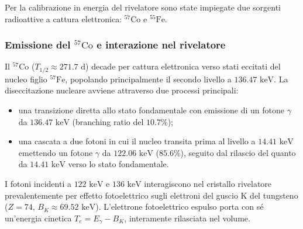 Per la calibrazione in energia del rivelatore sono state impiegate due sorgenti radioattive a cattura elettronica: $^{57}\text{Co}$ e $^{55}\text{Fe}$.

\subsubsection*{Emissione del $^{57}\text{Co}$ e interazione nel rivelatore}
Il $^{57}\text{Co}$ ($T_{1/2} \approx 271.7\text{ d}$) decade per cattura elettronica verso stati eccitati del nucleo figlio $^{57}\text{Fe}$, popolando principalmente il secondo livello a $136.47\text{ keV}$. La diseccitazione nucleare avviene attraverso due processi principali:
\begin{itemize}
    \item una transizione diretta allo stato fondamentale con emissione di un fotone $\gamma$ da $136.47\text{ keV}$ (branching ratio del $10.7\%$);
    \item una cascata a due fotoni in cui il nucleo transita prima al livello a $14.41\text{ keV}$ emettendo un fotone $\gamma$ da $122.06\text{ keV}$ ($85.6\%$), seguito dal rilascio del quanto da $14.41\text{ keV}$ verso lo stato fondamentale.
\end{itemize}

I fotoni incidenti a $122\text{ keV}$ e $136\text{ keV}$ interagiscono nel cristallo rivelatore prevalentemente per effetto fotoelettrico sugli elettroni del guscio K del tungsteno ($Z = 74$, $B_K \approx 69.52\text{ keV}$). L'elettrone fotoelettrico espulso porta con sé un'energia cinetica $T_e = E_\gamma - B_K$, interamente rilasciata nel volume.

